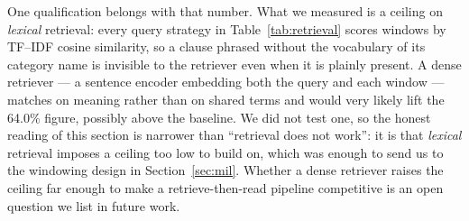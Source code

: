 One qualification belongs with that number. What we measured is a ceiling on \emph{lexical} retrieval: every query strategy in Table~\ref{tab:retrieval} scores windows by TF--IDF cosine similarity, so a clause phrased without the vocabulary of its category name is invisible to the retriever even when it is plainly present. A dense retriever --- a sentence encoder embedding both the query and each window --- matches on meaning rather than on shared terms and would very likely lift the 64.0\% figure, possibly above the baseline. We did not test one, so the honest reading of this section is narrower than ``retrieval does not work'': it is that \emph{lexical} retrieval imposes a ceiling too low to build on, which was enough to send us to the windowing design in Section~\ref{sec:mil}. Whether a dense retriever raises the ceiling far enough to make a retrieve-then-read pipeline competitive is an open question we list in future work.

